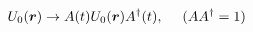 \begin{equation}
U_0(\mbox{\boldmath$r$}) \rightarrow A(t)U_0(\mbox{\boldmath$r$}) A^\dag(t), ~~~~(AA^\dag=1)  
\end{equation}

